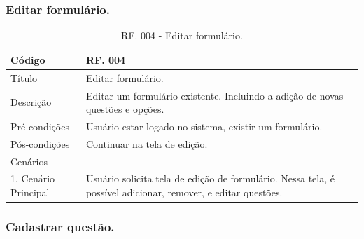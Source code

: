 \documentclass[11pt]{article}
\begin{document}
      \subsubsection{Editar formulário.}

        \begin{table}[h]
          \begin{center}
            \begin{tabular}{ | p{5cm} | p{10cm} | }
              \hline
              Código\cellcolor{gray} & RF. 004\cellcolor{gray} \\
              \hline
              Título & Editar formulário. \\
              \hline
              Descrição & Editar um formulário existente. Incluindo a adição de novas questões e opções. \\
              \hline
              Pré-condições & Usuário estar logado no sistema, existir um formulário. \\
              \hline
              Pós-condições & Continuar na tela de edição. \\
              \hline
              Cenários & \\
              \hline
              1.  Cenário Principal & Usuário solicita tela de edição de formulário. Nessa tela, é possível adicionar, remover, e editar questões. \\
              \hline
            \end{tabular}
            \caption{RF. 004 - Editar formulário.}
          \end{center}
        \end{table}

    \clearpage
  
      \subsubsection{Cadastrar questão.}
\end{document}
